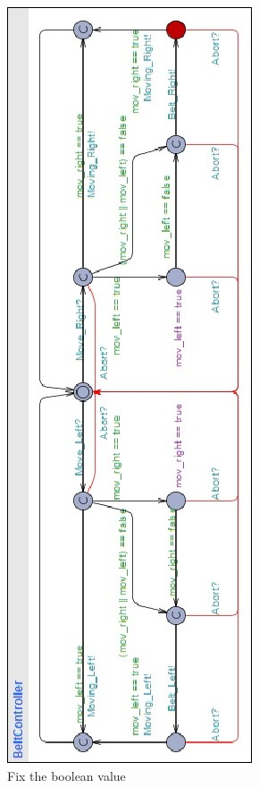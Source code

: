 \documentclass[a4paper,oneside,11pt]{report}
\begin{document}
\begin{figure}
\centering
\includegraphics[height=0.75\textheight]{images/BCTR3.jpg}
\caption{Fix the boolean value}
\label{fig:bctr3}
\end{figure}
\end{document}
